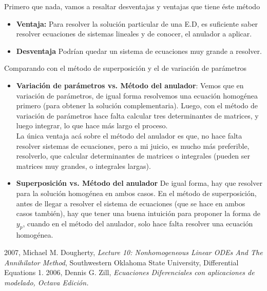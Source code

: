 \documentclass{article}
\theoremstyle{definition}
\begin{document}
Primero que nada, vamos a resaltar desventajas y ventajas que tiene \'{e}ste m\'{e}todo
\begin{itemize}
	\item \textbf{Ventaja: }Para resolver la soluci\'{o}n particular de una E.D, es suficiente saber resolver ecuaciones de sistemas lineales y de conocer, el anulador a aplicar.
	\item \textbf{Desventaja} Podr\'{i}an quedar un sistema de ecuaciones muy grande a resolver.
\end{itemize}

Comparando con el m\'{e}todo de superposici\'{o}n y el de variaci\'{o}n de par\'{a}metros
\begin{itemize}
\item \textbf{Variaci\'{o}n de par\'{a}metros vs. M\'{e}todo del anulador}: Vemos que en variaci\'{o}n de par\'{a}metros, de igual forma resolvemos una ecuaci\'{o}n homog\'{e}nea primero (para obtener la soluci\'{o}n complementaria). Luego, con el m\'{e}todo de variaci\'{o}n de par\'{a}metros hace falta calcular tres determinantes de matrices, y luego integrar, lo que hace m\'{a}s largo el proceso. \\

La \'{u}nica ventaja ac\'{a} sobre el m\'{e}todo del anulador es que, no hace falta resolver sistemas de ecuaciones, pero a mi juicio, es mucho m\'{a}s preferible, resolverlo, que calcular determinantes de matrices o integrales (pueden ser matrices muy grandes, o integrales largas).

\item \textbf{Superposici\'{o}n vs. M\'{e}todo del anulador} De igual forma, hay que resolver para la soluci\'{o}n homog\'{e}nea en ambos casos. En el m\'{e}todo de superposici\'{o}n, antes de llegar a resolver el sistema de ecuaciones (que se hace en ambos casos tambi\'{e}n), hay que tener una buena intuici\'{o}n para proponer la forma de $y_p$, cuando en el m\'{e}todo del anulador, solo hace falta resolver una ecuaci\'{o}n homog\'{e}nea.

\end{itemize}

\begin{thebibliography}{99}
	 2007, Michael M. Dougherty,
	   {\it Lecture 10: Nonhomogeneous Linear ODEs And The Annihilator Method}, Southwestern Oklahoma State University, Differential Equations 1.
	    2006, Dennis G. Zill, \it{Ecuaciones Diferenciales con aplicaciones de modelado}, Octava Edici\'{o}n.
  \end{thebibliography}
\end{document}
